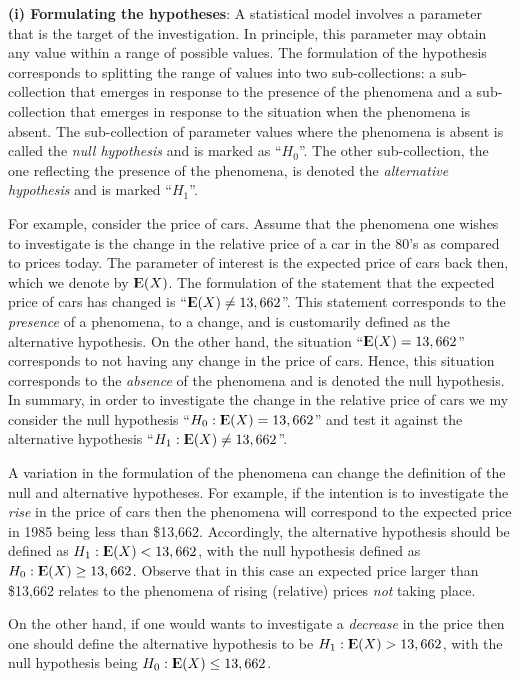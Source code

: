 \documentclass[]{krantz}
\newcommand{\Expec}{{\rm I\kern-.3em E}}
\theoremstyle{definition}
\theoremstyle{definition}
\theoremstyle{definition}
\theoremstyle{remark}
\begin{document}
{\textbf{(i) Formulating the hypotheses}}: A statistical model involves a
parameter that is the target of the investigation. In principle, this
parameter may obtain any value within a range of possible values. The
formulation of the hypothesis corresponds to splitting the range of
values into two sub-collections: a sub-collection that emerges in
response to the presence of the phenomena and a sub-collection that
emerges in response to the situation when the phenomena is absent. The
sub-collection of parameter values where the phenomena is absent is
called the \emph{null hypothesis} and is marked as ``\(H_0\)''. The other
sub-collection, the one reflecting the presence of the phenomena, is
denoted the \emph{alternative hypothesis} and is marked ``\(H_1\)''.

For example, consider the price of cars. Assume that the phenomena one
wishes to investigate is the change in the relative price of a car in
the 80's as compared to prices today. The parameter of interest is the
expected price of cars back then, which we denote by \(\Expec(X)\). The
formulation of the statement that the expected price of cars has changed
is ``\(\Expec(X) \not = 13,662\)''. This statement corresponds to the
\emph{presence} of a phenomena, to a change, and is customarily defined as
the alternative hypothesis. On the other hand, the situation
``\(\Expec(X) = 13,662\)'' corresponds to not having any change in the price
of cars. Hence, this situation corresponds to the \emph{absence} of the
phenomena and is denoted the null hypothesis. In summary, in order to
investigate the change in the relative price of cars we my consider the
null hypothesis ``\(H_0:\Expec(X) = 13,662\)'' and test it against the
alternative hypothesis ``\(H_1: \Expec(X)\not = 13,662\)''.

A variation in the formulation of the phenomena can change the
definition of the null and alternative hypotheses. For example, if the
intention is to investigate the \emph{rise} in the price of cars then the
phenomena will correspond to the expected price in 1985 being less than
\$13,662. Accordingly, the alternative hypothesis should be defined as
\(H_1: \Expec(X) < 13,662\), with the null hypothesis defined as
\(H_0: \Expec(X) \geq 13,662\). Observe that in this case an expected
price larger than \$13,662 relates to the phenomena of rising (relative)
prices \emph{not} taking place.

On the other hand, if one would wants to investigate a \emph{decrease} in the
price then one should define the alternative hypothesis to be
\(H_1: \Expec(X) > 13,662\), with the null hypothesis being
\(H_0: \Expec(X) \leq 13,662\).
\end{document}
